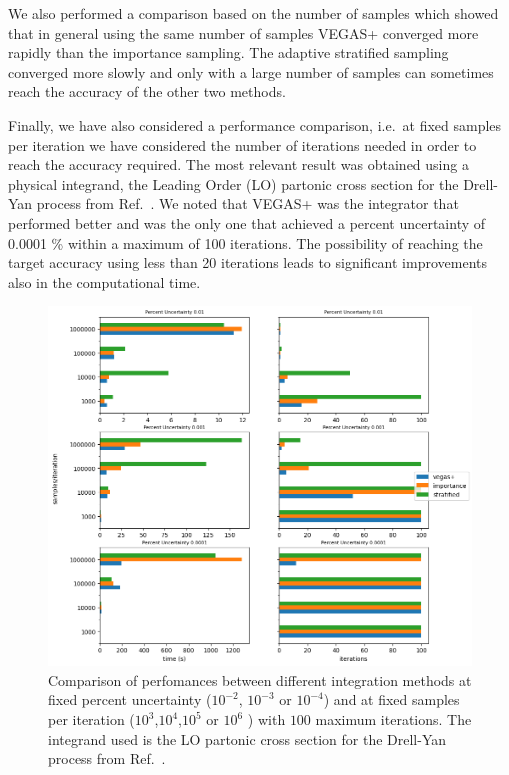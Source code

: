 \documentclass[../main/main.tex]{subfiles}
\begin{document}
We also performed a comparison based on the number of samples which showed that in general using the same number of samples VEGAS+
converged more rapidly than the importance sampling. The adaptive stratified sampling converged more slowly and only with a large number of samples can sometimes reach the accuracy of the other two methods.

Finally, we have also considered a performance comparison, i.e.\ at fixed samples per iteration we have considered the number of iterations needed in order to reach the accuracy required.
The most relevant result was obtained using a physical integrand, the Leading Order (LO) partonic cross section for the Drell-Yan process from Ref.~\cite{Carrazza_2020}.
We noted that VEGAS+ was the integrator that performed better and was the only one that achieved a percent uncertainty of 0.0001 \% within a maximum of 100 iterations.
The possibility of reaching the target accuracy using less than 20 iterations leads to significant improvements also in the computational time. 

\begin{figure}
	\centering
	\includegraphics[width=15cm]{../../../tests/performance_plots/dy_aa.png}
	\caption{Comparison of perfomances between different integration methods at fixed percent uncertainty ($10^{-2}$, $10^{-3}$ or $10^{-4}$) and at fixed samples per iteration ($10^3$,$10^4$,$10^5$ or $10^6$ ) with $100$ maximum iterations. The integrand used is the LO partonic cross section for the Drell-Yan process from Ref.~\cite{Carrazza_2020}.}
	\label{dy_aa}
\end{figure}
\end{document}

